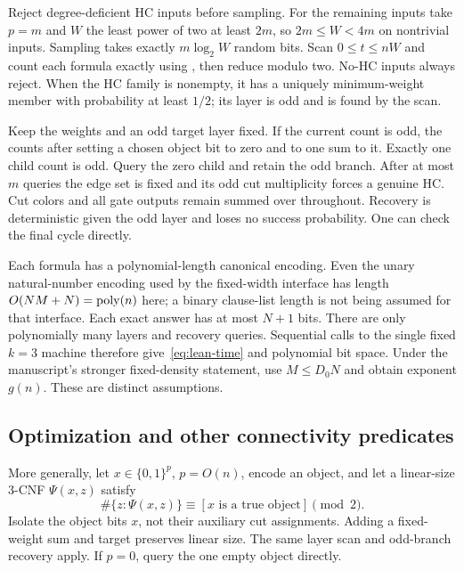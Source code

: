 Reject degree-deficient HC inputs before sampling. For the remaining
inputs take $p=m$ and $W$ the least power of two at least $2m$,
so $2m\le W<4m$ on nontrivial inputs. Sampling takes exactly
$m\log_2 W$ random bits. Scan $0\le t\le nW$ and count each
formula exactly using \HLean, then reduce modulo two. No-HC inputs
always reject. When the HC family is nonempty, it has a uniquely
minimum-weight member with probability at least $1/2$; its layer
is odd and is found by the scan.

Keep the weights and an odd target layer fixed. If the current count
is odd, the counts after setting a chosen object bit to zero and to
one sum to it. Exactly one child count is odd. Query the zero child
and retain the odd branch. After at most $m$ queries the edge set is
fixed and its odd cut multiplicity forces a genuine HC. Cut colors
and all gate outputs remain summed over throughout. Recovery is
deterministic given the odd layer and loses no success probability.
One can check the final cycle directly.

Each formula has a polynomial-length canonical encoding. Even the
unary natural-number encoding used by the fixed-width interface
has length $O(NM+N)=\operatorname{poly}(n)$ here; a binary clause-list length is
not being assumed for that interface. Each exact answer has at most
$N+1$ bits. There are only polynomially many layers and recovery
queries. Sequential calls to the single fixed $k=3$ machine therefore
give~\eqref{eq:lean-time} and polynomial bit space. Under the
manuscript's stronger fixed-density statement, use $M\le D_0N$
and obtain exponent $g(n)$. These are distinct assumptions.

\subsection{Optimization and other connectivity predicates}
\label{sec:lean-objects}

More generally, let $x\in\{0,1\}^p$, $p=O(n)$, encode an object,
and let a linear-size 3-CNF $\Psi(x,z)$ satisfy
\begin{equation}\label{eq:lean-parity-interface}
 \#\{z:\Psi(x,z)\}\equiv[x\text{ is a true object}]\pmod2.
\end{equation}
Isolate the object bits $x$, not their auxiliary cut assignments.
Adding a fixed-weight sum and target preserves linear size. The same
layer scan and odd-branch recovery apply. If $p=0$, query the one
empty object directly.

